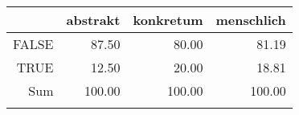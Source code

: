 \begin{tabular}{rrrr}
  \lsptoprule
 & abstrakt & konkretum & menschlich \\ 
  \midrule
FALSE & 87.50 & 80.00 & 81.19 \\ 
  TRUE & 12.50 & 20.00 & 18.81 \\ 
  Sum & 100.00 & 100.00 & 100.00 \\ 
   \lspbottomrule
\end{tabular}
